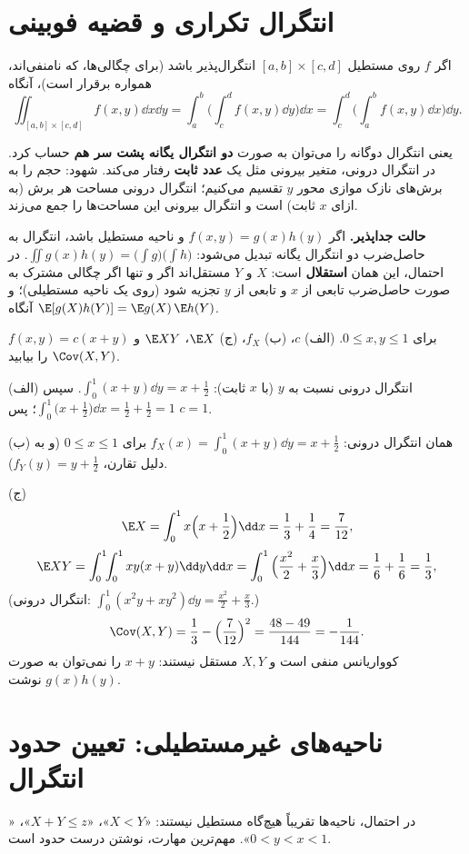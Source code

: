 \section{انتگرال تکراری و قضیه فوبینی}
\begin{theorem}[فوبینی]
اگر $f$ روی مستطیل $[a,b]\times[c,d]$ انتگرال‌پذیر باشد (برای چگالی‌ها، که نامنفی‌اند، همواره برقرار است)، آنگاه
\[
\iint_{[a,b]\times[c,d]}f(x,y)\dd x\dd y=\int_a^b\Big(\int_c^df(x,y)\dd y\Big)\dd x=\int_c^d\Big(\int_a^bf(x,y)\dd x\Big)\dd y .
\]
\end{theorem}
یعنی انتگرال دوگانه را می‌توان به صورت \textbf{دو انتگرال یگانه پشت سر هم} حساب کرد. در انتگرال درونی، متغیر بیرونی مثل یک \textbf{عدد ثابت} رفتار می‌کند. شهود: حجم را به برش‌های نازک موازی محور $y$ تقسیم می‌کنیم؛ انتگرال درونی مساحت هر برش (به ازای $x$ ثابت) است و انتگرال بیرونی این مساحت‌ها را جمع می‌زند.

\textbf{حالت جداپذیر.} اگر $f(x,y)=g(x)h(y)$ و ناحیه مستطیل باشد، انتگرال به حاصل‌ضرب دو انتگرال یگانه تبدیل می‌شود: $\iint g(x)h(y)=\Big(\int g\Big)\Big(\int h\Big)$. در احتمال، این همان \textbf{استقلال} است: $X$ و $Y$ مستقل‌اند اگر و تنها اگر چگالی مشترک به صورت حاصل‌ضرب تابعی از $x$ و تابعی از $y$ تجزیه شود (روی یک ناحیه مستطیلی)؛ و آنگاه $\E[g(X)h(Y)]=\E g(X)\,\E h(Y)$.

\begin{example}
$f(x,y)=c(x+y)$ برای $0\le x,y\le1$. (الف) $c$، (ب) $f_X$، (ج) $\E X$، $\E XY$ و $\Cov(X,Y)$ را بیابید.
\begin{solution}
(الف) انتگرال درونی نسبت به $y$ (با $x$ ثابت): $\int_0^1(x+y)\dd y=x+\frac12$. سپس $\int_0^1\big(x+\frac12\big)\dd x=\frac12+\frac12=1$؛ پس $c=1$.

(ب) همان انتگرال درونی: $f_X(x)=\int_0^1(x+y)\dd y=x+\frac12$ برای $0\le x\le1$ (و به دلیل تقارن، $f_Y(y)=y+\frac12$).

(ج)
\[
\E X=\int_0^1x\Big(x+\frac12\Big)\dd x=\frac13+\frac14=\frac{7}{12},
\]
\[
\E XY=\int_0^1\!\!\int_0^1xy(x+y)\dd y\dd x=\int_0^1\Big(\frac{x^2}{2}+\frac{x}{3}\Big)\dd x=\frac16+\frac16=\frac13 ,
\]
(انتگرال درونی: $\int_0^1(x^2y+xy^2)\dd y=\frac{x^2}{2}+\frac x3$.)
\[
\Cov(X,Y)=\frac13-\Big(\frac{7}{12}\Big)^2=\frac{48-49}{144}=-\frac{1}{144}.
\]
کوواریانس منفی است و $X,Y$ مستقل نیستند: $x+y$ را نمی‌توان به صورت $g(x)h(y)$ نوشت.
\end{solution}
\end{example}

\section{ناحیه‌های غیرمستطیلی: تعیین حدود انتگرال}
در احتمال، ناحیه‌ها تقریباً هیچ‌گاه مستطیل نیستند: «$X<Y$»، «$X+Y\le z$»، «$0<y<x<1$». مهم‌ترین مهارت، نوشتن درست حدود است.

